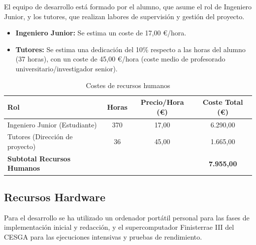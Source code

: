 El equipo de desarrollo está formado por el alumno, que asume el rol de Ingeniero Junior, y los tutores, que realizan labores de supervisión y gestión del proyecto.

\begin{itemize}
    \item \textbf{Ingeniero Junior:} Se estima un coste de 17,00 \euro/hora.
    \item \textbf{Tutores:} Se estima una dedicación del 10\% respecto a las horas del alumno (37 horas), con un coste de 45,00 \euro/hora (coste medio de profesorado universitario/investigador senior).
\end{itemize}

\begin{table}[h!]
    \centering
    \setlength{\tabcolsep}{5pt}
    \begin{tabularx}{\textwidth}{|X|c|c|c|}
        \hline
        \textbf{Rol} & \textbf{Horas} & \textbf{Precio/Hora (\euro)} & \textbf{Coste Total (\euro)} \\ \hline
        Ingeniero Junior (Estudiante) & 370 & 17,00 & 6.290,00 \\
        Tutores (Dirección de proyecto) & 36 & 45,00 & 1.665,00 \\ \hline
        \textbf{Subtotal Recursos Humanos} & & & \textbf{7.955,00} \\ \hline
    \end{tabularx}
    \caption{Costes de recursos humanos}
    \label{tab:costes_rrhh}
\end{table}


\subsection{Recursos Hardware}\label{subsec:recursos-hardware}

Para el desarrollo se ha utilizado un ordenador portátil personal para las fases de implementación inicial y redacción, y el supercomputador Finisterrae III del CESGA para las ejecuciones intensivas y pruebas de rendimiento.

